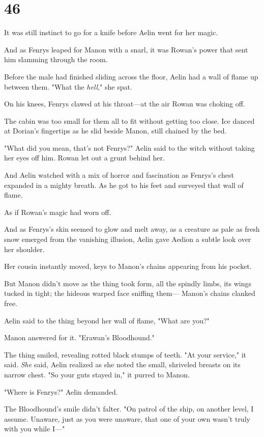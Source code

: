 
\chapter{46}

It was still instinct to go for a knife before Aelin went for her magic.

And as Fenrys leaped for Manon with a snarl, it was Rowan's power that sent him slamming through the room.

Before the male had finished sliding across the floor, Aelin had a wall of flame up between them.
"What the \emph{hell}," she spat.

On his knees, Fenrys clawed at his throat---at the air Rowan was choking off.

The cabin was too small for them all to fit without getting too close.
Ice danced at Dorian's fingertips as he slid beside Manon, still chained by the bed.

"What did you mean, that's not Fenrys?"
Aelin said to the witch without taking her eyes off him.
Rowan let out a grunt behind her.

And Aelin watched with a mix of horror and fascination as Fenrys's chest expanded in a mighty breath.
As he got to his feet and surveyed that wall of flame.

As if Rowan's magic had worn off.

And as Fenrys's skin seemed to glow and melt away, as a creature as pale as fresh snow emerged from the vanishing illusion, Aelin gave Aedion a subtle look over her shoulder.

Her cousin instantly moved, keys to Manon's chains appearing from his pocket.

But Manon didn't move as the thing took form, all the spindly limbs, its wings tucked in tight; the hideous warped face sniffing them--- Manon's chains clanked free.

Aelin said to the thing beyond her wall of flame, "What are you?"

Manon answered for it.
"Erawan's Bloodhound."

The thing smiled, revealing rotted black stumps of teeth.
"At your service," it said.
\emph{She} said, Aelin realized as she noted the small, shriveled breasts on its narrow chest.
"So your guts stayed in," it purred to Manon.

"Where is Fenrys?"
Aelin demanded.

The Bloodhound's smile didn't falter.
"On patrol of the ship, on another level, I assume.
Unaware, just as you were unaware, that one of your own wasn't truly with you while I---"

